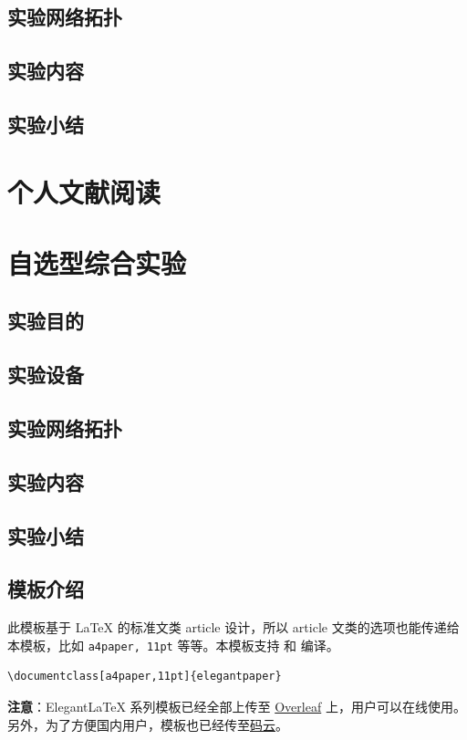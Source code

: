 \documentclass[lang=cn,11pt,a4paper,cite=authoryear]{elegantpaper}
\begin{document}
\subsection{实验网络拓扑}
\subsection{实验内容}
\subsection{实验小结}
\section{个人文献阅读}
\section{自选型综合实验}
\subsection{实验目的}
\subsection{实验设备}
\subsection{实验网络拓扑}
\subsection{实验内容}
\subsection{实验小结}

\subsection{模板介绍}

此模板基于 \LaTeX{} 的标准文类 article 设计，所以 article 文类的选项也能传递给本模板，比如 \lstinline{a4paper, 11pt} 等等。本模板支持  和  编译。

\begin{lstlisting}
\documentclass[a4paper,11pt]{elegantpaper}
\end{lstlisting}

\textbf{注意}：Elegant\LaTeX{} 系列模板已经全部上传至 \href{https://www.overleaf.com/latex/templates/elegantpaper-template/yzghrqjhmmmr}{Overleaf} 上，用户可以在线使用。另外，为了方便国内用户，模板也已经传至\href{https://gitee.com/ElegantLaTeX/ElegantPaper}{码云}。
\end{document}
